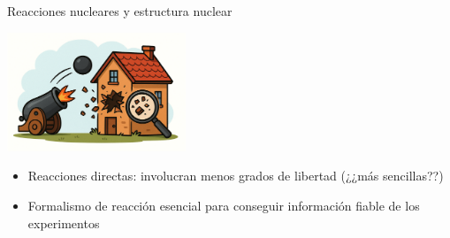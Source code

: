 \documentclass{beamer}
\begin{document}
\begin{frame}{Reacciones nucleares y estructura nuclear} 
    \begin{center}
    \includegraphics[width=0.4\textwidth]{cannon.png}
    \end{center}
    \begin{itemize}
    \item Reacciones directas: involucran menos grados de libertad (¿¿más sencillas??)
    \item Formalismo de reacción esencial para conseguir información fiable de los experimentos
    \end{itemize}
\end{frame}
\end{document}
